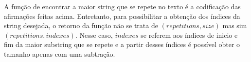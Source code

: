 A função de encontrar a maior string que se repete no texto é a codificação
das afirmações feitas acima.
Entretanto, para possibilitar a obtenção dos índices da string desejada, o
retorno da função não se trata de $(repetitions, size)$ mas sim $(repetitions,
indexes)$.
Nesse caso, $indexes$ se referem aos índices de inicio e fim da maior substring
que se repete e a partir desses índices é possível obter o tamanho apenas com
uma subtração.
